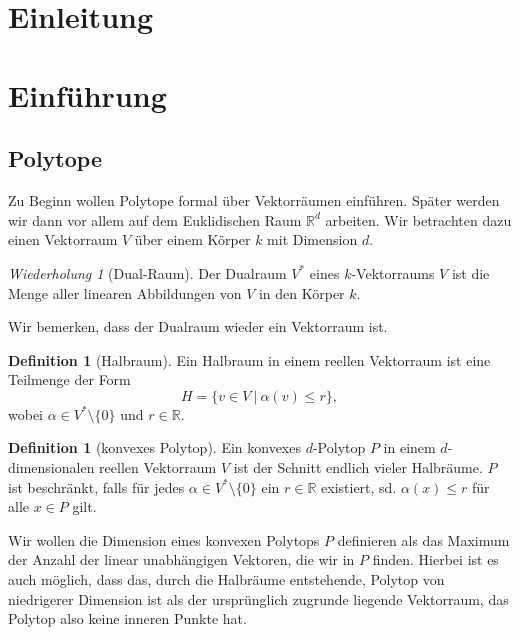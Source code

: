 \documentclass[11pt,titlepage]{article}
\newcommand{\setR}{\mathbb{R}}
\theoremstyle{definition}
\newtheorem{definition}[theorem]{Definition}
\theoremstyle{remark}
\newtheorem*{repetition}{Wiederholung}
\begin{document}
	\newpage \ 
	\thispagestyle{empty}
	\newpage
	\thispagestyle{empty}
	
	\tableofcontents
	
	
	\newpage \
	\thispagestyle{empty} 
	\newpage
	\setcounter{page}{1}
	
	\section{Einleitung}
	
	\section{Einführung}
	
	\subsection{Polytope}
	
	Zu Beginn wollen Polytope formal über Vektorräumen einführen. Später werden 
	wir dann vor allem auf dem Euklidischen Raum $\setR^d$ arbeiten. 
	Wir betrachten dazu einen Vektorraum $V$ über einem Körper $k$ mit Dimension $d$. 
	
	\begin{repetition}[Dual-Raum]
		Der Dualraum $V^*$ eines $k$-Vektorraums $V$ ist die Menge aller linearen Abbildungen von $V$ in den Körper $k$.
	\end{repetition}
	Wir bemerken, dass der Dualraum wieder ein Vektorraum ist.
	
	\begin{definition}[Halbraum]
		Ein Halbraum in einem reellen Vektorraum ist eine Teilmenge der Form
		\[ H= \{ v\in V \  \vert\  \alpha(v)\leq r \}, \]
		wobei $\alpha\in V^*\setminus\{0\}$ und $r\in\setR$.
	\end{definition}
	
	\begin{definition}[konvexes Polytop]
		Ein konvexes $d$-Polytop $P$ in einem $d$-dimensionalen reellen Vektorraum $V$ ist der Schnitt endlich vieler 
		Halbräume. $P$ ist beschränkt, falls für jedes $\alpha\in V^*\setminus\{0\}$ ein $r\in \setR$ existiert, sd. 
		$\alpha(x)\leq r$ für alle $x\in P$ gilt.
	\end{definition}
	
	Wir wollen die Dimension eines konvexen Polytops $P$ definieren als das 
	Maximum der Anzahl der linear unabhängigen Vektoren, die wir in $P$ finden. 
	Hierbei ist es auch möglich, dass das, durch die Halbräume entstehende, Polytop 
	von niedrigerer Dimension ist als der ursprünglich zugrunde liegende 
	Vektorraum, das Polytop also keine inneren Punkte hat. 
	
\end{document}

